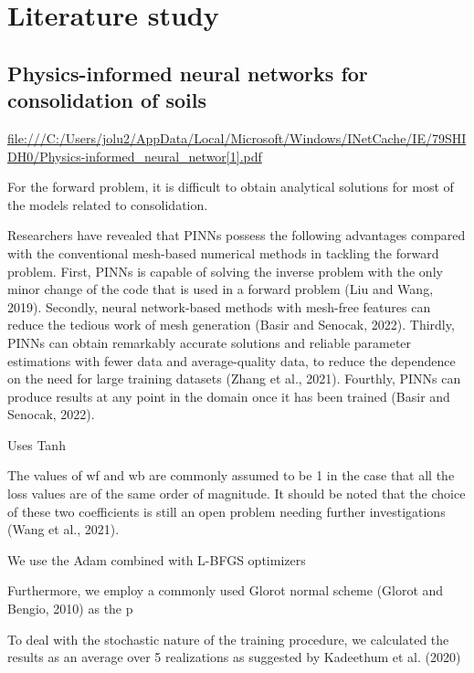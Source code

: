 


\chapter{Literature study}

\section{Physics-informed neural networks
  for consolidation of soils}

\url{file:///C:/Users/jolu2/AppData/Local/Microsoft/Windows/INetCache/IE/79SHIDH0/Physics-informed_neural_networ[1].pdf
}

For the forward problem, it is difficult to obtain analytical solutions for most of the
models related to consolidation.

Researchers have revealed that PINNs possess the following advantages compared with the conventional mesh-based numerical methods in tackling the forward problem.
First, PINNs is capable of solving the inverse problem with the only minor change of the code that is used in a forward problem (Liu and Wang, 2019). Secondly, neural network-based methods with mesh-free features can reduce the tedious work of mesh generation (Basir and Senocak, 2022).
Thirdly, PINNs can obtain remarkably accurate solutions and reliable parameter estimations with fewer data and average-quality data, to reduce the dependence on the need for large training datasets (Zhang et al., 2021). Fourthly, PINNs can produce results at any point in the domain once it has been trained (Basir and Senocak, 2022).

Uses Tanh

The values of wf and wb are commonly assumed to be 1 in the case that all the loss values are of the same order of magnitude. It should be noted that the choice of these two coefficients is still an open problem needing further investigations (Wang et al., 2021).

We use the Adam combined with L-BFGS optimizers

Furthermore, we employ a commonly used Glorot
normal scheme (Glorot and Bengio, 2010) as the p

To deal with the stochastic nature of the training
procedure, we calculated the results as an average over 5 realizations as suggested by
Kadeethum et al. (2020)

